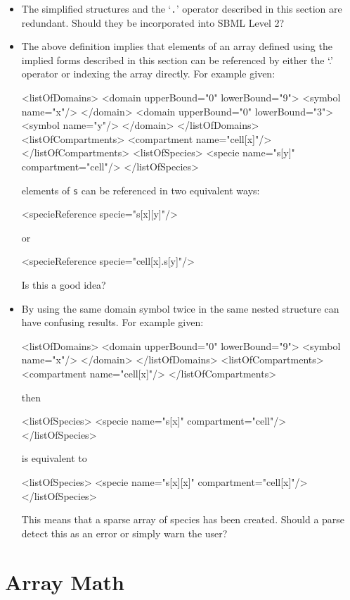 \documentclass{cekarticle}
\begin{document}
\begin{itemize}
\item
The simplified structures and the `\texttt{.}' operator
described in this section are redundant.  Should they be
incorporated into SBML Level 2?
\item
The above definition implies that elements of an array defined using the implied forms
described in this section can be referenced by either the `.' operator or indexing the array directly.
For example given:
\begin{example}
<listOfDomains>
    <domain upperBound="0" lowerBound="9">
        <symbol name="x"/>
    </domain>
    <domain upperBound="0" lowerBound="3">
        <symbol name="y"/>
    </domain>
</listOfDomains>
<listOfCompartments>
    <compartment name="cell[x]"/>
</listOfCompartments>
<listOfSpecies>
    <specie name="s[y]" compartment="cell"/>
</listOfSpecies>
\end{example}
elements of \texttt{s} can be referenced in two equivalent ways:
\begin{example}
<specieReference specie="s[x][y]"/>
\end{example}
or
\begin{example}
<specieReference specie="cell[x].s[y]"/>
\end{example}

Is this a good idea?

\item
By using the same domain symbol twice in the same nested structure can have confusing results.
For example given:
\begin{example}
<listOfDomains>
    <domain upperBound="0" lowerBound="9">
        <symbol name="x"/>
    </domain>
</listOfDomains>
<listOfCompartments>
    <compartment name="cell[x]"/>
</listOfCompartments>
\end{example}
then
\begin{example}
<listOfSpecies>
    <specie name="s[x]" compartment="cell"/>
</listOfSpecies>
\end{example}
is equivalent to
\begin{example}
<listOfSpecies>
    <specie name="s[x][x]" compartment="cell[x]"/>
</listOfSpecies>
\end{example}

This means that a sparse array of species has been created.
Should a parse detect this as an error or simply warn the user?
\end{itemize}

\section{Array Math}
\label{sec:math}
\end{document}
